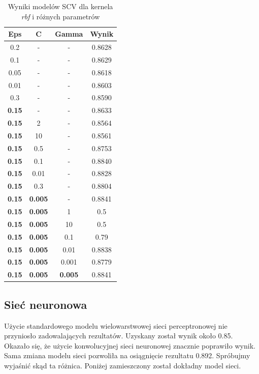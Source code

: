 \documentclass[12pt]{article}
\begin{document}
\begin{table}[H]
    \centering
    \begin{tabular}{|c|c|c|c|}
    \hline
    Eps & C & Gamma & Wynik \\
    \hline
    \hline
    0.2 & - & - & 0.8628 \\
    \hline
    0.1 & - & - & 0.8629 \\
    \hline
    0.05 & - & - & 0.8618 \\
    \hline
    0.01 & - & - & 0.8603 \\
    \hline
    0.3 & - & - & 0.8590 \\
    \hline
    \textbf{0.15} & - & - & 0.8633 \\
    \hline
    \textbf{0.15} & 2 & - & 0.8564 \\
    \hline
    \textbf{0.15} & 10 & - & 0.8561 \\
    \hline
    \textbf{0.15} & 0.5 & - & 0.8753 \\
    \hline
    \textbf{0.15} & 0.1 & - & 0.8840 \\
    \hline
    \textbf{0.15} & 0.01 & - & 0.8828 \\
    \hline
    \textbf{0.15} & 0.3 & - & 0.8804 \\
    \hline
    \textbf{0.15} & \textbf{0.005} & - & 0.8841 \\
    \hline
    \textbf{0.15} & \textbf{0.005} & 1 & 0.5 \\
    \hline
    \textbf{0.15} & \textbf{0.005} & 10 & 0.5 \\
    \hline
    \textbf{0.15} & \textbf{0.005} & 0.1 & 0.79 \\
    \hline
    \textbf{0.15} & \textbf{0.005} & 0.01 & 0.8838 \\
    \hline
    \textbf{0.15} & \textbf{0.005} & 0.001 & 0.8779 \\
    \hline
    \textbf{0.15} & \textbf{0.005} & \textbf{0.005} & 0.8841 \\
    \hline
    \end{tabular}
    \caption{Wyniki modelów SCV dla kernela \textit{rbf} i różnych parametrów}
    \label{tab:my_label}
\end{table}

\subsection{Sieć neuronowa}
Użycie standardowego modelu wielowarstwowej sieci perceptronowej nie przyniosło zadowalających rezultatów. Uzyskany został wynik około 0.85. Okazało się, że użycie konwolucyjnej sieci neuronowej znacznie poprawiło wynik. Sama zmiana modelu sieci pozwoliła na osiągnięcie rezultatu 0.892. Spróbujmy wyjaśnić skąd ta różnica. Poniżej zamieszczony został dokładny model sieci.
\end{document}
